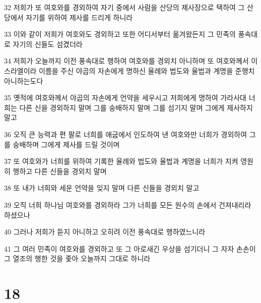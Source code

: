 \par 32 저희가 또 여호와를 경외하여 자기 중에서 사람을 산당의 제사장으로 택하여 그 산당에서 자기를 위하여 제사를 드리게 하니라
\par 33 이와 같이 저희가 여호와도 경외하고 또한 어디서부터 옮겨왔든지 그 민족의 풍속대로 자기의 신들도 섬겼더라
\par 34 저희가 오늘까지 이전 풍속대로 행하여 여호와를 경외치 아니하며 또 여호와께서 이스라엘이라 이름을 주신 야곱의 자손에게 명하신 율례와 법도와 율법과 계명을 준행치 아니하는도다
\par 35 옛적에 여호와께서 야곱의 자손에게 언약을 세우시고 저희에게 명하여 가라사대 너희는 다른 신을 경외하지 말며 그를 숭배하지 말며 그를 섬기지 말며 그에게 제사하지 말고
\par 36 오직 큰 능력과 편 팔로 너희를 애굽에서 인도하여 낸 여호와만 너희가 경외하여 그를 숭배하며 그에게 제사를 드릴 것이며
\par 37 또 여호와가 너희를 위하여 기록한 율례와 법도와 율법과 계명을 너희가 지켜 영원히 행하고 다른 신들을 경외치 말며
\par 38 또 내가 너희와 세운 언약을 잊지 말며 다른 신들을 경외치 말고
\par 39 오직 너희 하나님 여호와를 경외하라 그가 너희를 모든 원수의 손에서 건져내리라 하셨으나
\par 40 그러나 저희가 듣지 아니하고 오히려 이전 풍속대로 행하였느니라
\par 41 그 여러 민족이 여호와를 경외하고 또 그 아로새긴 우상을 섬기더니 그 자자 손손이 그 열조의 행한 것을 좇아 오늘까지 그대로 하니라

\chapter{18}

